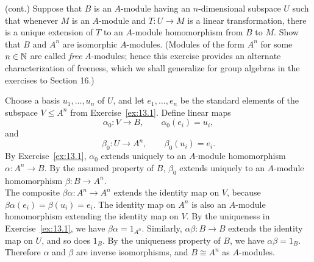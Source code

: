 \documentclass[../Odyssey_Project.tex]{subfiles}
\begin{document}
\begin{exercise}
\label{ex:13.2}
(cont.) Suppose that $B$ is an $A$-module having an $n$-dimensional subspace $U$ such that whenever $M$ is an $A$-module and $T \colon U \to M$ is a linear transformation, there is a unique extension of $T$ to an $A$-module homomorphism from $B$ to $M$. Show that $B$ and $A^n$ are isomorphic $A$-modules. (Modules of the form $A^n$ for some $n \in \mathbb{N}$ are called \emph{free} $A$-modules; hence this exercise provides an alternate characterization of freeness, which we shall generalize for group algebras in the exercises to Section 16.)
\end{exercise}
\begin{solution}
    Choose a basis $u_1,\ldots,u_n$ of $U$, and let $e_1,\ldots,e_n$ be the standard elements of the subspace $V\leq A^n$ from Exercise~\ref{ex:13.1}. Define linear maps
    \[
        \alpha_0 \colon V\to B,\qquad \alpha_0(e_i)=u_i,
    \]
    and
    \[
        \beta_0 \colon U\to A^n,\qquad \beta_0(u_i)=e_i.
    \]
    By Exercise~\ref{ex:13.1}, $\alpha_0$ extends uniquely to an $A$-module homomorphism $\alpha \colon A^n\to B$. By the assumed property of $B$, $\beta_0$ extends uniquely to an $A$-module homomorphism $\beta \colon B\to A^n$.\\
    The composite $\beta\alpha \colon A^n\to A^n$ extends the identity map on $V$, because $\beta\alpha(e_i)=\beta(u_i)=e_i$. The identity map on $A^n$ is also an $A$-module homomorphism extending the identity map on $V$. By the uniqueness in Exercise~\ref{ex:13.1}, we have $\beta\alpha=1_{A^n}$. Similarly, $\alpha\beta \colon B\to B$ extends the identity map on $U$, and so does $1_B$. By the uniqueness property of $B$, we have $\alpha\beta=1_B$. Therefore $\alpha$ and $\beta$ are inverse isomorphisms, and $B\cong A^n$ as $A$-modules.
\end{solution}
\end{document}

